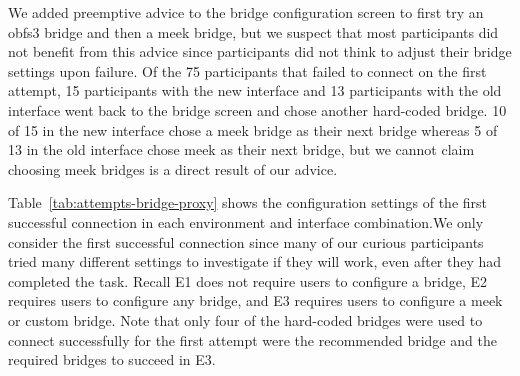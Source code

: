 \documentclass[USenglish,oneside,twocolumn]{article}
\begin{document}
{%



We added preemptive advice to the bridge configuration screen to first try an obfs3 bridge and then a meek bridge, but we suspect that most participants did not benefit from this advice since participants did not think to adjust their bridge settings upon failure. Of the 75 participants that failed to connect on the first attempt, 15 participants with the new interface and 13 participants with the old interface went back to the bridge screen and chose another hard-coded bridge. 10 of 15 in the new interface chose a meek bridge as their next bridge whereas 5 of 13 in the old interface chose meek as their next bridge, but we cannot claim choosing meek bridges is a direct result of our advice.

Table~\ref{tab:attempts-bridge-proxy} shows the configuration settings of the first successful connection in each environment and interface combination.We only consider the first successful connection since many of our curious participants tried many different settings to investigate if they will work, even after they had completed the task. Recall E1 does not require users to configure a bridge, E2 requires users to configure any bridge, and E3 requires users to configure a meek or custom bridge. Note that only four of the hard-coded bridges were used to connect successfully for the first attempt were the recommended bridge and the required bridges to succeed in E3.

}
\end{document}
